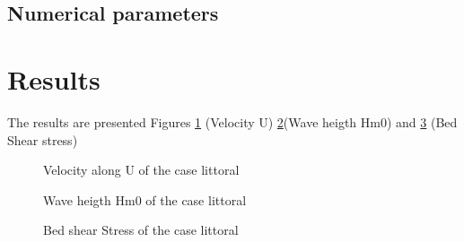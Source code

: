 %
%
\subsection{Numerical parameters}
%

%
%
\section{Results}
%
The results are presented Figures \ref{resultsT2D} (Velocity U) \ref{resultsTOM}(Wave heigth Hm0) and  \ref{resultsSIS} (Bed Shear stress)
\begin{figure} [!h]
\centering
{}
 \caption{Velocity along U of the case littoral}
\label{resultsT2D}
\end{figure}
\begin{figure} [!h]
\centering
{}
 \caption{Wave heigth Hm0 of the case littoral}
\label{resultsTOM}
\end{figure}
\begin{figure} [!h]
\centering
{}
 \caption{Bed shear Stress of the case littoral}
\label{resultsSIS}
\end{figure}



